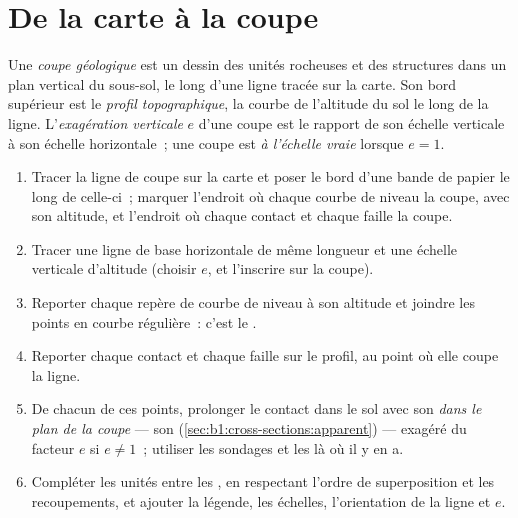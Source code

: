 \section{De la carte à la coupe}

\begin{definition}\label{def:b1:cross-sections:section}
Une \emph{coupe géologique} est un dessin des unités rocheuses et des structures
dans un plan vertical du sous-sol, le long d'une ligne tracée sur la carte. Son
bord supérieur est le \emph{profil topographique},
la courbe de l'altitude du sol le long de la ligne. L'\emph{exagération
verticale} $e$ d'une coupe est le rapport de son échelle verticale à son
échelle horizontale~; une coupe est \emph{à l'échelle vraie} lorsque $e = 1$.
\end{definition}

\begin{method}\label{met:b1:cross-sections:construct}
\begin{enumerate}
  \item Tracer la ligne de coupe sur la carte et poser le bord d'une bande de
        papier le long de celle-ci~; marquer l'endroit où chaque courbe de niveau
        la coupe, avec son altitude, et l'endroit où chaque contact et chaque
        faille la coupe.
  \item Tracer une ligne de base horizontale de même longueur et une échelle
        verticale d'altitude (choisir $e$, et l'inscrire sur la coupe).
  \item Reporter chaque repère de courbe de niveau à son altitude et joindre les
        points en courbe régulière~: c'est le .
  \item Reporter chaque contact et chaque faille sur le profil, au point où elle
        coupe la ligne.
  \item De chacun de ces points, prolonger le contact dans le sol avec son
         \emph{dans le plan de la coupe} --- son 
        (\cref{sec:b1:cross-sections:apparent}) --- exagéré du facteur $e$ si
        $e \ne 1$~; utiliser les sondages et les  là où il
        y en a.
  \item Compléter les unités entre les , en respectant l'ordre de
        superposition et les recoupements, et ajouter la légende, les échelles,
        l'orientation de la ligne et $e$.
\end{enumerate}
\end{method}

